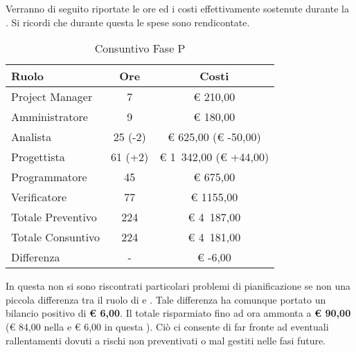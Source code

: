 	Verranno di seguito riportate le ore ed i costi effettivamente sostenute durante la . Si ricordi che durante questa  le spese sono rendicontate.
	\begin{table}[H]
		\begin{center}
			\begin{tabular}{| l | c | c |}
				\hline
				Ruolo 				& Ore 	& Costi  \\ \hline
				
				Project Manager		& 7 		& \euro{} 210,00 	\\
				Amministratore 		& 9 		& \euro{} 180,00 	\\
				Analista	 		& 25 (-2) 		& \euro{} 625,00 (\euro{} -50,00)	\\
				Progettista 		& 61 (+2)		& \euro{} 1~342,00 (\euro{} +44,00) 	\\
				Programmatore		& 45 		& \euro{} 675,00 	\\
				Verificatore		& 77 		& \euro{} 1155,00 	\\ \hline \hline
				
				Totale Preventivo	& 224 			& \euro{} 4~187,00 	\\ \hline
				Totale Consuntivo	& 224 			& \euro{} 4~181,00 	\\ \hline
				Differenza			& - 			& \euro{} -6,00 	\\ \hline
			\end{tabular}
		\end{center}
		\caption{Consuntivo Fase P}
	\end{table}
			In questa  non si sono riscontrati particolari problemi di pianificazione se non una piccola differenza tra il ruolo di  e . Tale differenza ha comunque portato un bilancio positivo di \textbf{\euro{} 6,00}.
			Il totale risparmiato fino ad ora ammonta a \textbf{\euro{} 90,00} (\euro{} 84,00 nella  e \euro{} 6,00 in questa ). Ciò ci consente di far fronte ad eventuali rallentamenti dovuti a rischi non preventivati o mal gestiti nelle fasi future.
	

						
